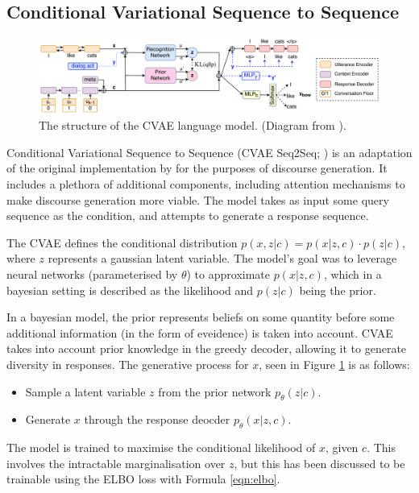 \documentclass[12pt,twoside]{report}
\begin{document}
\subsection{Conditional Variational Sequence to Sequence}

\begin{figure}[!ht]
	\centering
	\includegraphics[width=120mm]{diagrams/cvae_seq2seq.png}
	\caption{The structure of the CVAE language model. (Diagram from \cite{zhao_learning_2017}). \label{cvae_seq2seq}}
\end{figure}

Conditional Variational Sequence to Sequence (CVAE Seq2Seq; \cite{zhao_learning_2017}) is an adaptation of the original implementation by \cite{bowman_generating_2015} for the purposes of discourse generation. It includes a plethora of additional components, including attention mechanisms to make discourse generation more viable. The model takes as input some query sequence as the condition, and attempts to generate a response sequence.

The CVAE defines the conditional distribution $p(x,z|c) = p(x|z,c)\cdot p(z|c)$, where $z$ represents a gaussian latent variable. The model's goal was to leverage neural networks (parameterised by $\theta$) to approximate $p(x|z,c)$, which in a bayesian setting is described as the likelihood and $p(z|c)$ being the prior. 

In a bayesian model, the prior represents beliefs on some quantity before some additional information (in the form of eveidence) is taken into account. CVAE takes into account prior knowledge in the greedy decoder, allowing it to generate diversity in responses. The generative process for $x$, seen in Figure \ref{cvae_seq2seq} is as follows:

\begin{itemize}
	\item Sample a latent variable $z$ from the prior network $p_\theta (z|c)$.
	\item Generate $x$ through the response deocder $p_\theta(x|z,c)$.
\end{itemize}

The model is trained to maximise the conditional likelihood of $x$, given $c$. This involves the intractable marginalisation over $z$, but this has been discussed to be trainable using the ELBO loss with Formula \ref{eqn:elbo}. 
\end{document}
